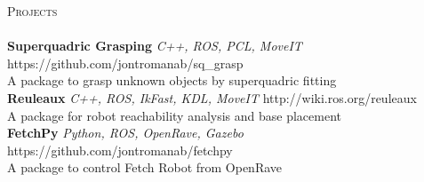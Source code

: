 \documentclass[a4paper]{article}
\newcommand{\lineunder} {
    \vspace*{-8pt} \\
    \hspace*{-18pt} \hrulefill \\
}
\newcommand{\header} [1] {
    {\hspace*{-18pt}\vspace*{6pt} \textsc{#1}}
    \vspace*{-6pt} \lineunder
}
\begin{document}
\vspace*{2mm}

\header{Projects}
{\textbf{Superquadric Grasping} \sl C++, ROS, PCL, MoveIT} \hfill https://github.com/jontromanab/sq\_grasp\\
A package to grasp unknown objects by superquadric fitting\\
\vspace*{2mm}
{\textbf{Reuleaux} \sl C++, ROS, IkFast, KDL, MoveIT} \hfill http://wiki.ros.org/reuleaux\\
A package for robot reachability analysis and base placement\\
\vspace*{2mm}
{\textbf{FetchPy} \sl Python, ROS, OpenRave, Gazebo} \hfill https://github.com/jontromanab/fetchpy\\
A package to control Fetch Robot from OpenRave\\
\vspace*{2mm}

\vspace*{2mm}

        

\ 
\end{document}
